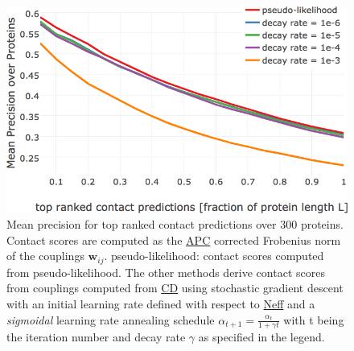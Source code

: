 \documentclass[11pt,a4paper,twoside]{book}
\newcommand{\wij}{\mathbf{w}_{ij}}
\theoremstyle{definition}
\theoremstyle{definition}
\theoremstyle{remark}
\begin{document}
\begin{figure}

{\centering \includegraphics[width=0.85\linewidth]{img/full_likelihood/appendix/precision_vs_rank_alpha0_0_sig_decayrate} 

}

\caption{Mean precision for top ranked
contact predictions over 300 proteins. Contact scores are computed as
the \protect\hyperlink{abbrev}{APC} corrected Frobenius norm of the
couplings \(\wij\). pseudo-likelihood: contact scores computed from
pseudo-likelihood. The other methods derive contact scores from
couplings computed from \protect\hyperlink{abbrev}{CD} using stochastic
gradient descent with an initial learning rate defined with respect to
\protect\hyperlink{abbrev}{Neff} and a \emph{sigmoidal} learning rate
annealing schedule \(\alpha_{t+1} = \frac{\alpha_{t}}{1 + \gamma t}\)
with t being the iteration number and decay rate \(\gamma\) as specified
in the legend.}\label{fig:performance-cd-sigschedule}
\end{figure}
\end{document}
